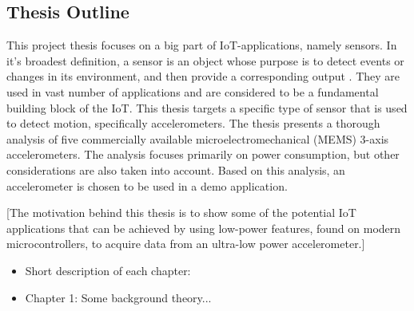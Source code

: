 \subsection{Thesis Outline}

This project thesis focuses on a big part of IoT-applications, namely sensors. In it's broadest definition, a sensor is an object whose purpose is to detect events or changes in its environment, and then provide a corresponding output \cite{wikipedia_sensors}. They are used in vast number of applications and are considered to be a fundamental building block of the IoT. This thesis targets a specific type of sensor that is used to detect motion, specifically accelerometers. The thesis presents a thorough analysis of five commercially available microelectromechanical (MEMS) 3-axis accelerometers. The analysis focuses primarily on power consumption, but other considerations are also taken into account. Based on this analysis, an accelerometer is chosen to be used in a demo application.

[The motivation behind this thesis is to show some of the potential IoT applications that can be achieved by using low-power features, found on modern microcontrollers, to acquire data from an ultra-low power accelerometer.]

\begin{itemize}
\item Short description of each chapter:
\item Chapter 1: Some background theory...
\end{itemize}

\newpage

